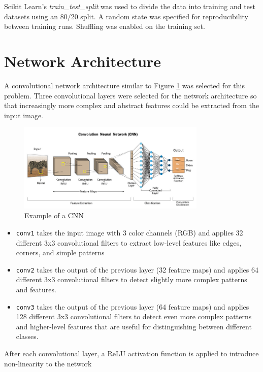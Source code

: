 \documentclass{article}
\begin{document}
Scikit Learn's \emph{train\_test\_split} was used to divide the data into training and test datasets using an 80/20 split. A random state was specified for reproducibility between training runs. Shuffling was enabled on the training set.


\section{Network Architecture}

A convolutional network architecture similar to Figure \ref{fig:network_architecture}  was selected for this problem. Three convolutional layers were selected for the network architecture so that increasingly more complex and 
abstract features could be extracted from the input image.

\begin{figure}
    \centering
    \includegraphics[width=0.8\textwidth]{cnn.png}
    \caption{Example of a CNN}
    \label{fig:network_architecture}
\end{figure}

\begin{itemize}
    \item \verb|conv1|  takes the input image with 3 color channels (RGB) and applies 32 different 3x3 convolutional filters to extract low-level features like edges, corners, and simple patterns
    \item \verb|conv2| takes the output of the previous layer (32 feature maps) and applies 64 different 3x3 convolutional filters to detect slightly more complex patterns and features.
    \item \verb|conv3| takes the output of the previous layer (64 feature maps) and applies 128 different 3x3 convolutional filters to detect even more complex patterns and higher-level features that are useful for distinguishing between different classes.
\end{itemize}


After each convolutional layer, a ReLU activation function is applied to introduce non-linearity to the network
\end{document}
